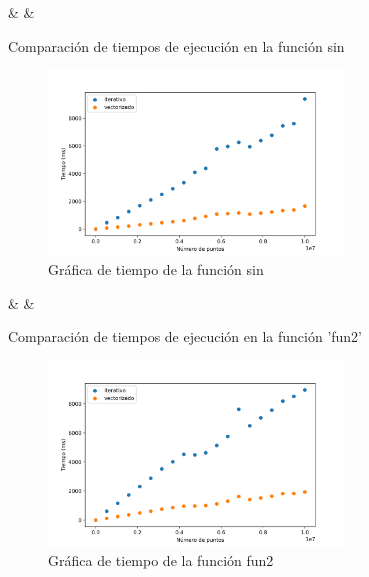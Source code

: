 \documentclass[6pt]{AiTex}
\begin{document}
\begin{table}[H]
    \centering
    {\casos & \iterativo & \vectorizado}
    \caption{Comparación de tiempos de ejecución en la función sin}
    \label{table:sin}
\end{table}

\begin{figure}[H]
    \centering
    \includegraphics[width=0.7\textwidth]{./imagenes/tiempos_sin.png}
    \caption{Gráfica de tiempo de la función sin}
    \label{fig:tiempos_sin}
\end{figure}

\begin{table}[H]
    \centering
    {\casos & \iterativo & \vectorizado}
    \caption{Comparación de tiempos de ejecución en la función 'fun2'}
    \label{table:fun2}
\end{table}

\begin{figure}[H]
    \centering
    \includegraphics[width=0.7\textwidth]{./imagenes/tiempos_fun2.png}
    \caption{Gráfica de tiempo de la función fun2}
    \label{fig:tiempos_fun2}
\end{figure}
\end{document}
